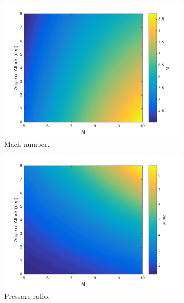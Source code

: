 \begin{figure}[ht]
	\begin{subfigure}{.5\textwidth}
		\centering
		\includegraphics[width=0.99\linewidth]{figures/3_vehicle_design/ConicalM}
		\caption{Mach number.}
		\label{fig:ConicalM}
	\end{subfigure}
	\begin{subfigure}{.5\textwidth}
		\centering
		\includegraphics[width=0.99\linewidth]{figures/3_vehicle_design/ConicalP}
		\caption{Pressure ratio.}
		\label{fig:ConicalP}
	\end{subfigure}
	\begin{subfigure}{.5\textwidth}
		\centering

\end{subfigure}
\end{figure}
